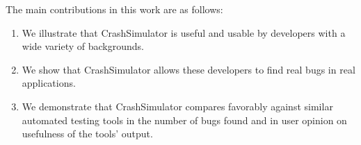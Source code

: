 The main contributions in this work are as follows:
\begin{enumerate}

\item We illustrate that CrashSimulator is useful and usable by developers
with a wide variety of backgrounds.

\item We show that CrashSimulator allows these developers to find real bugs
in real applications.

\item We demonstrate that CrashSimulator compares favorably against similar
automated testing tools in the number of bugs found and in user opinion on
usefulness of the tools' output.

\end{enumerate}
